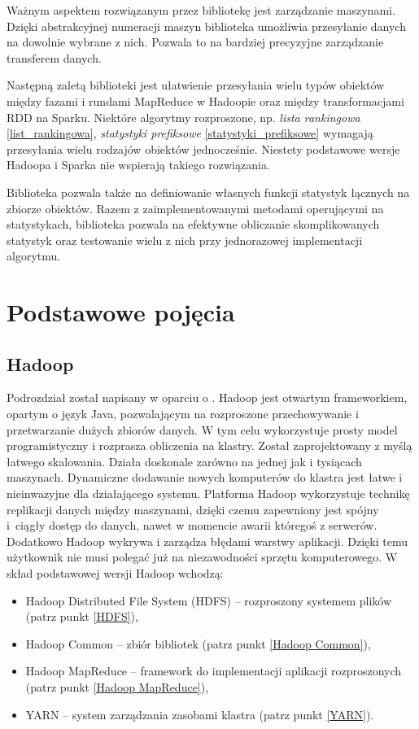 \documentclass[magisterska]{pracamgr}
\begin{document}
Ważnym aspektem rozwiązanym przez bibliotekę jest zarządzanie maszynami. Dzięki abstrakcyjnej numeracji maszyn biblioteka umożliwia przesyłanie danych na dowolnie wybrane z nich. Pozwala to na bardziej precyzyjne zarządzanie transferem danych.

Następną zaletą biblioteki jest ułatwienie przesyłania wielu typów obiektów między fazami i rundami MapReduce w Hadoopie oraz między transformacjami RDD na Sparku. Niektóre algorytmy rozproszone, np. \textit{lista rankingowa} \ref{list_rankingowa}, \textit{statystyki prefiksowe} \ref{statystyki_prefiksowe} wymagają przesyłania wielu rodzajów obiektów jednocześnie. Niestety podstawowe wersje Hadoopa i Sparka nie wspierają takiego rozwiązania. 

Biblioteka pozwala także na definiowanie własnych funkcji statystyk łącznych na zbiorze obiektów. Razem z zaimplementowanymi metodami operującymi na statystykach, biblioteka  pozwala na efektywne obliczanie skomplikowanych statystyk oraz testowanie wielu z nich przy jednorazowej implementacji algorytmu.

\chapter{Podstawowe pojęcia}\label{r:pojecia}
\setlength{\parindent}{6.5ex}
\section{Hadoop}
Podrozdział został napisany w oparciu o \cite{shvachko2010hadoop, taylor2010overview, white2012hadoop}. Hadoop jest otwartym frameworkiem, opartym o język Java, pozwalającym na rozproszone przechowywanie i przetwarzanie dużych zbiorów danych. W tym celu wykorzystuje prosty model programistyczny i rozprasza obliczenia na klastry. Został zaprojektowany z myślą łatwego skalowania. Działa doskonale zarówno na jednej jak i tysiącach maszynach. Dynamiczne dodawanie nowych komputerów do klastra jest łatwe i nieinwazyjne dla działającego systemu. Platforma Hadoop wykorzystuje technikę replikacji danych między maszynami, dzięki czemu zapewniony jest spójny i~ciągły dostęp do danych, nawet w momencie awarii któregoś z serwerów. Dodatkowo Hadoop wykrywa i zarządza błędami warstwy aplikacji. Dzięki temu użytkownik nie musi polegać już na niezawodności sprzętu komputerowego. W skład podstawowej wersji Hadoop wchodzą:

\begin{itemize}
    \item Hadoop Distributed File System (HDFS) -- rozproszony systemem plików (patrz punkt \ref{HDFS}),
    \item Hadoop Common -- zbiór bibliotek (patrz punkt \ref{Hadoop Common}),
    \item Hadoop MapReduce -- framework do implementacji aplikacji rozproszonych (patrz punkt \ref{Hadoop MapReduce}),
    \item YARN -- system zarządzania zasobami klastra (patrz punkt \ref{YARN}).
\end{itemize}
\end{document}
